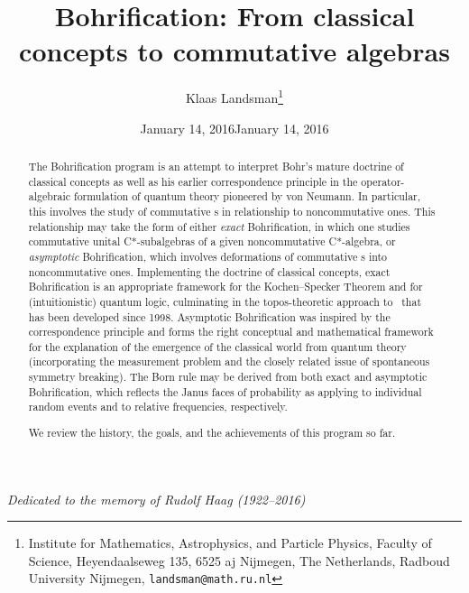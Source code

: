 \documentclass[12pt]{article}
\date{January 14, 2016}
\begin{document}
 
 \setlength{\unitlength}{1cm}\cleardoublepage
\thispagestyle{empty}
\title{\Large{Bohrification: From classical concepts to commutative algebras}}
\author{Klaas Landsman\footnote{Institute for Mathematics, Astrophysics, and Particle Physics, Faculty of Science, Heyendaalseweg 135, 6525 {\sc aj Nijmegen, The Netherlands}, 
Radboud University Nijmegen,
\texttt{landsman@math.ru.nl}}}
\date{January 14, 2016}
\maketitle\vspace{-10mm}
\begin{center}
\emph{Dedicated to the memory of Rudolf Haag (1922--2016)}
\end{center}
 \begin{abstract} 
\noindent 
The Bohrification program is an attempt to interpret Bohr's mature doctrine of classical concepts  as well as his earlier correspondence principle in the operator-algebraic formulation of quantum theory pioneered by von Neumann.
 In particular, this involves the study of commutative \ca s in relationship to noncommutative ones. This relationship 
 may  take the form of either \emph{exact} Bohrification, in which one studies commutative unital C*-subalgebras of a given noncommutative C*-algebra, or  \emph{asymptotic} Bohrification, which involves deformations of commutative \ca s into noncommutative ones. Implementing the doctrine of classical concepts, exact Bohrification  is an appropriate framework for the Kochen--Specker Theorem and for (intuitionistic) quantum logic, culminating in the topos-theoretic approach to \qm\ that has been developed since 1998. 
Asymptotic Bohrification was inspired by the correspondence principle and forms the right conceptual and mathematical framework for the explanation of the emergence of the classical world from quantum theory (incorporating the
 measurement problem and the closely related issue of spontaneous symmetry breaking). 
 The  Born rule may be derived  from both exact and  asymptotic Bohrification, which  reflects
 the Janus faces of probability as applying to individual random events and to relative frequencies, respectively.

We review the history, the goals, and the achievements of this program so far. 
\end{abstract}
\maketitle
\newpage
\begin{small}
\begin{quote}
 \tableofcontents
\end{quote}
\end{small}
\clearpage
\newpage
\end{document}
